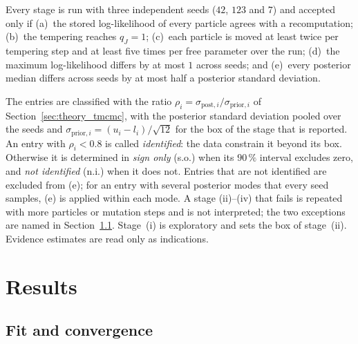 Every stage is run with three independent seeds ($42$, $123$ and $7$) and accepted only if
(a)~the stored log-likelihood of every particle agrees with a recomputation;
(b)~the tempering reaches $q_J=1$;
(c)~each particle is moved at least twice per tempering step and at least five
times per free parameter over the run;
(d)~the maximum log-likelihood differs by at most $1$ across seeds; and
(e)~every posterior median differs across seeds by at most half a posterior
standard deviation.

The entries are classified with the ratio $\rho_i=\sigma_{\mathrm{post},i}/
\sigma_{\mathrm{prior},i}$ of Section~\ref{sec:theory_tmcmc}, with the posterior
standard deviation pooled over the seeds and
$\sigma_{\mathrm{prior},i}=(u_i-l_i)/\sqrt{12}$ for the box of the stage that is
reported. An entry with $\rho_i<0.8$ is called \emph{identified}: the data
constrain it beyond its box. Otherwise it is determined in \emph{sign only}
(s.o.) when its $90\,\%$ interval excludes zero, and \emph{not identified}
(n.i.) when it does not. Entries that are not identified are excluded from (e);
for an entry with several posterior modes that every seed samples, (e) is
applied within each mode. A stage (ii)--(iv) that fails is repeated with more
particles or mutation steps and is not interpreted; the two exceptions are
named in Section~\ref{sec:heine_fit}. Stage~(i) is exploratory and sets the box
of stage~(ii). Evidence estimates are read only as indications.

\section{Results}
\label{sec:heine_results}

\subsection{Fit and convergence}
\label{sec:heine_fit}

